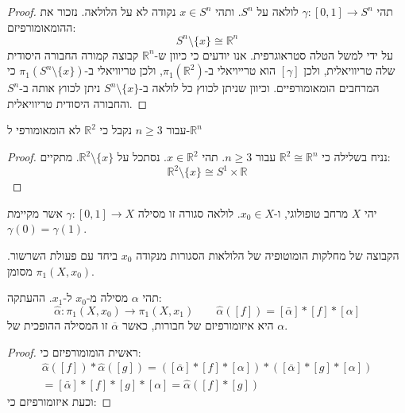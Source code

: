 \documentclass{tstextbook}
\begin{document}
\begin{proof}
תהי \(\gamma:[0,1]\to S^{n}\) לולאה על \(S^{n}\). ותהי \(x \in S^{n}\) נקודה לא על הלולאה. נזכור את ההומאומורפיזם:
$$S^{n}\setminus \{ x \}\cong \mathbb{R}^{n}$$
על ידי למשל הטלה סטראוגרפית. אנו יודעים כי כיוון ש-\(\mathbb{R}^{n}\) קבוצה קמורה החבורה היסודית שלה טריוויאלית, ולכן \(\left[ \gamma \right]\) הוא טרייויאלי ב-\(\pi_{1}\left( \mathbb{R}^{2} \right)\), ולכן טריוויאלי ב-\(\pi_{1}\left( S^{n}\setminus \{ x \} \right)\) כי המרחבים הומאומורפיים. וכיוון שניתן לכווץ כל לולאה ב-\(S^{n}\setminus \{ x \}\) ניתן לכווץ אותה ב-\(S^{n}\) והחבורה היסודית טריוויאלית.

\end{proof}
\begin{proposition}
עבור \(n\geq 3\) נקבל כי \(\mathbb{R}^{2}\) לא הומאומורפי ל-\(\mathbb{R}^{n}\)

\end{proposition}
\begin{proof}
נניח בשלילה כי \(\mathbb{R}^{2}\cong \mathbb{R}^{n}\) עבור \(n\geq 3\). תהי \(x\in \mathbb{R}^{2}\). נסתכל על \(\mathbb{R}^{2}\setminus \{x \}\). מתקיים:
$$\mathbb{R}^{2}\setminus \{ x \}\cong S^{1}\times \mathbb{R}$$

\end{proof}
\begin{definition}
יהי \(X\) מרחב טופולוגי, ו-\(x_{0} \in X\). לולאה סגורה זו מסילה \(\gamma:[0,1]\to X\) אשר מקיימת \(\gamma(0)=\gamma(1)\).

\end{definition}
\begin{definition}
הקבוצה של מחלקות הומוטופיה של הלולאות הסגורות מנקודה \(x_{0}\) ביחד עם פעולת השרשור. מסומן \(\pi_{1}(X,x_{0})\).

\end{definition}
\begin{proposition}
תהי \(\alpha\) מסילה מ-\(x_{0}\) ל-\(x_{1}\). ההעתקה:
$$\hat{\alpha}:\pi_{1}(X,x_{0})\longrightarrow\pi_{1}(X,x_{1})\qquad \hat{\alpha}([f])=[\bar{\alpha}]*[f]*[\alpha]$$
היא איזומורפיזם של חבורות, כאשר \(\overline{\alpha}\) זו המסילה ההופכית של \(\alpha\).

\end{proposition}
\begin{proof}
ראשית הומומורפיזם כי:
\begin{gather*}\hat{\alpha}([f])*\hat{\alpha}([g])=\left( \left[ \bar{\alpha} \right]*[f]*\left[ \alpha \right] \right)*\left( \left[ \bar{\alpha} \right]*[g]*\left[ \alpha \right] \right)  \\=[\bar{\alpha}]\ast[f]\ast[g]\ast[\alpha]={\hat{\alpha}}([f]\ast[g])
\end{gather*}
וכעת איזומורפיזם כי:

\end{proof}
\end{document}

